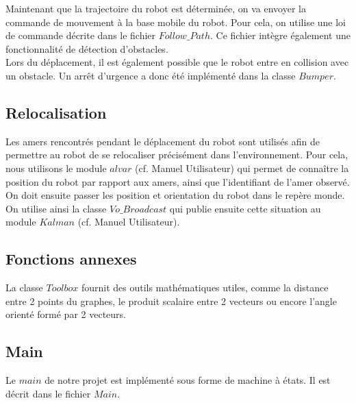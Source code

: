 \documentclass[10pt,a4paper]{article}
\begin{document}
Maintenant que la trajectoire du robot est déterminée, on va envoyer la commande de mouvement à la base mobile du robot. Pour cela, on utilise une loi de commande décrite dans le fichier $Follow\_Path$. Ce fichier intègre également une fonctionnalité de détection d'obstacles.\\
Lors du déplacement, il est également possible que le robot entre en collision avec un obstacle. Un arrêt d'urgence a donc été implémenté dans la classe $Bumper$.


\subsection{Relocalisation}
\label{sec:relocalisation}

Les amers rencontrés pendant le déplacement du robot sont utilisés afin de permettre au robot de se relocaliser précisément dans l'environnement. Pour cela, nous utilisons le module $alvar$ (cf. Manuel Utilisateur) qui permet de connaître la position du robot par rapport aux amers, ainsi que l'identifiant de l'amer observé. On doit ensuite passer les position et orientation du robot dans le repère monde. On utilise ainsi la classe $Vo\_Broadcast$ qui publie ensuite cette situation au module $Kalman$ (cf. Manuel Utilisateur).


\subsection{Fonctions annexes}
\label{sec:fonctions_annexes}

La classe $Toolbox$ fournit des outils mathématiques utiles, comme la distance entre 2 points du graphes, le produit scalaire entre 2 vecteurs ou encore l'angle orienté formé par 2 vecteurs.


\subsection{Main}
\label{sec:main}

Le $main$ de notre projet est implémenté sous forme de machine à états. Il est décrit dans le fichier $Main$.
\end{document}

